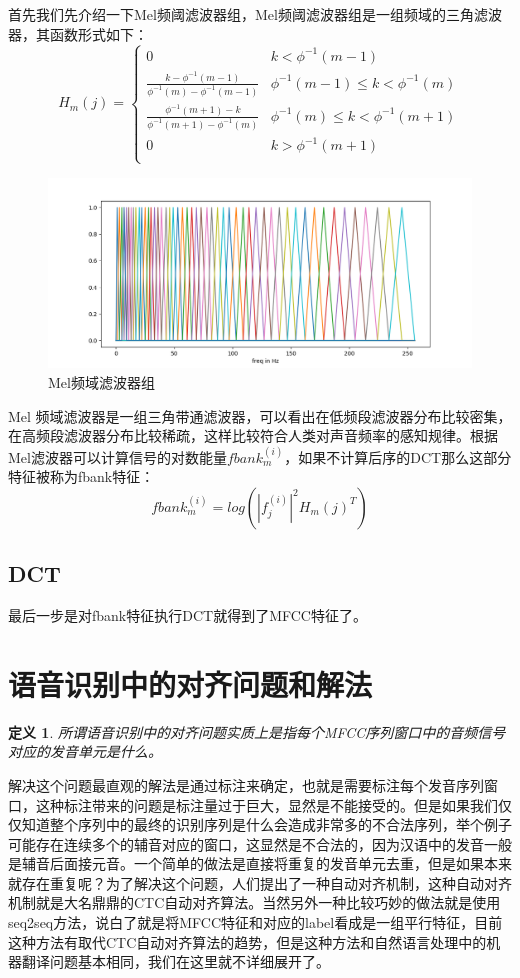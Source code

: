 \documentclass[twoside,a4paper,12pt]{book}%
\newtheorem{definition}{定义}
\begin{document}
首先我们先介绍一下Mel频阈滤波器组，Mel频阈滤波器组是一组频域的三角滤波器，其函数形式如下：
$$
H_m(j)  =\left\{  
\begin{array}{ll}  
	0 & k<\phi^{-1}(m−1)\\
	\frac{k-\phi^{-1}(m-1)}{\phi^{-1}(m)-\phi^{-1}(m-1)} & \phi^{-1}(m−1)\le k < \phi^{-1}(m)\\
	\frac{\phi^{-1}(m+1)-k}{\phi^{-1}(m+1)-\phi^{-1}(m)} & \phi^{-1}(m)\le k < \phi^{-1}(m+1)\\
	0 & k > \phi^{-1}(m+1) \\
\end{array}  
\right .  
$$
\begin{figure}[htbp]
	\begin{center}
		\includegraphics[width=5.8in]{figures/mfcc1.png}
		\caption{Mel频域滤波器组}
		\label{fig:mfcc1}
	\end{center}
\end{figure}

Mel 频域滤波器是一组三角带通滤波器，可以看出在低频段滤波器分布比较密集，在高频段滤波器分布比较稀疏，这样比较符合人类对声音频率的感知规律。根据Mel滤波器可以计算信号的对数能量$fbank^{(i)}_m$，如果不计算后序的DCT那么这部分特征被称为fbank特征：
$$
fbank^{(i)}_m=log(|f^{(i)}_j|^2 H_m(j)^T) 
$$

\subsection{DCT}
最后一步是对fbank特征执行DCT就得到了MFCC特征了。


\section{语音识别中的对齐问题和解法}
\begin{definition}
	所谓语音识别中的对齐问题实质上是指每个MFCC序列窗口中的音频信号对应的发音单元是什么。
\end{definition}
解决这个问题最直观的解法是通过标注来确定，也就是需要标注每个发音序列窗口，这种标注带来的问题是标注量过于巨大，显然是不能接受的。但是如果我们仅仅知道整个序列中的最终的识别序列是什么会造成非常多的不合法序列，举个例子可能存在连续多个的辅音对应的窗口，这显然是不合法的，因为汉语中的发音一般是辅音后面接元音。一个简单的做法是直接将重复的发音单元去重，但是如果本来就存在重复呢？为了解决这个问题，人们提出了一种自动对齐机制，这种自动对齐机制就是大名鼎鼎的CTC自动对齐算法。当然另外一种比较巧妙的做法就是使用seq2seq方法，说白了就是将MFCC特征和对应的label看成是一组平行特征，目前这种方法有取代CTC自动对齐算法的趋势，但是这种方法和自然语言处理中的机器翻译问题基本相同，我们在这里就不详细展开了。
\end{document}
